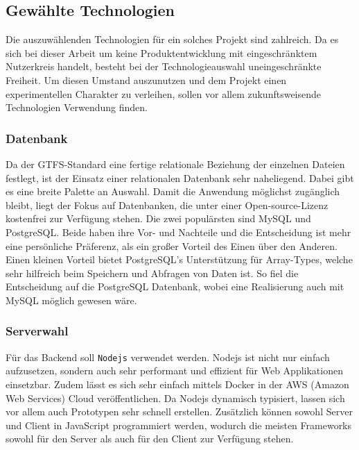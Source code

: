 \subsection{Gewählte Technologien}
\label{ssub:gewählte_technologien}
  Die auszuwählenden Technologien für ein solches Projekt sind zahlreich. Da es sich bei dieser Arbeit um keine Produktentwicklung mit eingeschränktem Nutzerkreis handelt, besteht bei der Technologieauswahl uneingeschränkte Freiheit. Um diesen Umstand auszunutzen und dem Projekt einen experimentellen Charakter zu verleihen, sollen vor allem zukunftsweisende Technologien Verwendung finden.
  
  \subsubsection{Datenbank}
  \label{ssub:datenbank}
    Da der GTFS-Standard eine fertige relationale Beziehung der einzelnen Dateien festlegt, ist der Einsatz einer relationalen Datenbank sehr naheliegend. Dabei gibt es eine breite Palette an Auswahl. Damit die Anwendung möglichst zugänglich bleibt, liegt der Fokus auf Datenbanken, die unter einer Open-source-Lizenz kostenfrei zur Verfügung stehen. Die zwei populärsten sind MySQL und PostgreSQL\parencite{db_engines}. Beide haben ihre Vor- und Nachteile und die Entscheidung ist mehr eine persönliche Präferenz, als ein großer Vorteil des Einen über den Anderen. Einen kleinen Vorteil bietet PostgreSQL's Unterstützung für Array-Types, welche sehr hilfreich beim Speichern und Abfragen von Daten ist. So fiel die Entscheidung auf die PostgreSQL Datenbank, wobei eine Realisierung auch mit MySQL möglich gewesen wäre.

  \subsubsection{Serverwahl}
  \label{ssub:serverwahl}
    Für das Backend soll \texttt{Nodejs} verwendet werden. Nodejs ist nicht nur einfach aufzusetzen, sondern auch sehr performant und effizient für Web Applikationen einsetzbar. Zudem lässt es sich sehr einfach mittels Docker in der AWS (Amazon Web Services) Cloud veröffentlichen. Da Nodejs dynamisch typisiert, lassen sich vor allem auch Prototypen sehr schnell erstellen. Zusätzlich können sowohl Server und Client in JavaScript programmiert werden, wodurch die meisten Frameworks sowohl für den Server als auch für den Client zur Verfügung stehen.
  
